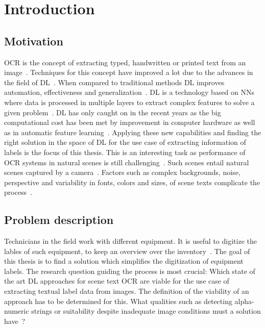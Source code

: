 \chapter{Introduction}\label{ch:intro}
\section{Motivation}
\ac{OCR} is the concept of extracting typed, handwritten or printed text
from an image~\citep{zhao_improving_2020}.
Techniques for this concept have improved a lot due to the advances in the field of
\ac{DL}~\citep{zhao_improving_2020}.
When compared to traditional methods \ac{DL} improves automation, effectiveness and
generalization~\citep{chen_text_2021}.
\ac{DL} is a technology based on \acp{NN} where data is processed
in multiple layers to extract complex features to solve a given problem~\citep{shrestha_review_2019}.
\ac{DL} has only caught on in the recent years as the big computational cost has been met
by improvement in computer hardware as well as in automatic feature
learning~\citep{ponti_everything_2017, chen_text_2021}.
Applying these new capabilities and finding the right solution in the space of \ac{DL} for the
use case of extracting information of labels is the focus of this thesis.
This is an interesting task as performance of \ac{OCR} systems in natural scenes is still
challenging~\citep{zhao_improving_2020, chen_text_2021}.
Such scenes entail natural scenes captured by a camera~\citep{chen_text_2021, baek_what_2019}.
Factors such as complex backgrounds, noise, perspective and variability in fonts, colors and sizes,
of scene texts complicate the process~\citep{hu_gtc_2020,chen_text_2021,baek_what_2019}.

\section{Problem description}\label{se:problem}
Technicians in the field work with different equipment.
It is useful to digitize the lables of such equipment, to keep an overview over the
inventory~\citep{abramowicz_business_2019}.
The goal of this thesis is to find a solution which simplifies the digitization of equipment labels.
The research question guiding the process is most crucial: Which state of the art \ac{DL}
approaches for scene text \ac{OCR} are viable for the use case of extracting textual label data
from images.
The definition of the viability of an approach has to be determined for this.
What qualities such as detecting alpha-numeric strings or suitability despite
inadequate image conditions must a solution have~\citep{ghosh_visual_2017, hu_gtc_2020}?

